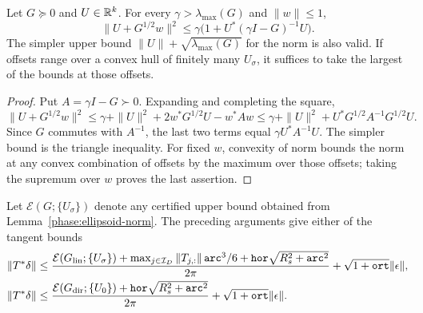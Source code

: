 \begin{lemma}
\label{phase:ellipsoid-norm}
Let \(G\succeq0\) and \(U\in\mathbb R^k\).  For every
\(\gamma>\lambda_{\max}(G)\) and \(\|w\|\leq1\),
\begin{equation}
 \|U+G^{1/2}w\|^2
   \leq\gamma\bigl(1+U^*(\gamma I-G)^{-1}U\bigr).
 \label{phase:ellipsoid-gamma}
\end{equation}
The simpler upper bound
\(\|U\|+\sqrt{\lambda_{\max}(G)}\) for the norm is also valid.
If offsets range over a convex hull of finitely many \(U_\sigma\),
it suffices to take the largest of the bounds at those offsets.
\end{lemma}

\begin{proof}
Put \(A=\gamma I-G\succ0\).  Expanding and completing the square,
\[
 \|U+G^{1/2}w\|^2
 \leq\gamma+\|U\|^2+
       2w^*G^{1/2}U-w^*Aw
 \leq\gamma+\|U\|^2+
       U^*G^{1/2}A^{-1}G^{1/2}U.
\]
Since \(G\) commutes with \(A^{-1}\), the last two terms equal
\(\gamma U^*A^{-1}U\).  The simpler bound is the triangle
inequality.  For fixed \(w\), convexity of norm bounds the norm at
any convex combination of offsets by the maximum over those
offsets; taking the supremum over \(w\) proves the last assertion.
\end{proof}

Let \(\mathcal E(G;\{U_\sigma\})\) denote any certified upper bound
obtained from Lemma~\ref{phase:ellipsoid-norm}.  The preceding
arguments give either of the tangent bounds
\begin{align}
 \|T^*\delta\|
 \leq{}&
 \frac{\mathcal E(G_{\rm lin};\{U_\sigma\})+
      \max_{j\in\mathcal I_D}\|T_{j,:}\|\,\mathtt{arc}^3/6+
      \mathtt{hor}\sqrt{R_s^2+\mathtt{arc}^2}}{2\pi}
       +\sqrt{1+\mathtt{ort}}\|\epsilon\|,
 \label{phase:tangent-linear}\\
 \|T^*\delta\|
 \leq{}&
 \frac{\mathcal E(G_{\rm dir};\{U_0\})+
      \mathtt{hor}\sqrt{R_s^2+\mathtt{arc}^2}}{2\pi}
       +\sqrt{1+\mathtt{ort}}\|\epsilon\|.
 \label{phase:tangent-direct}
\end{align}

